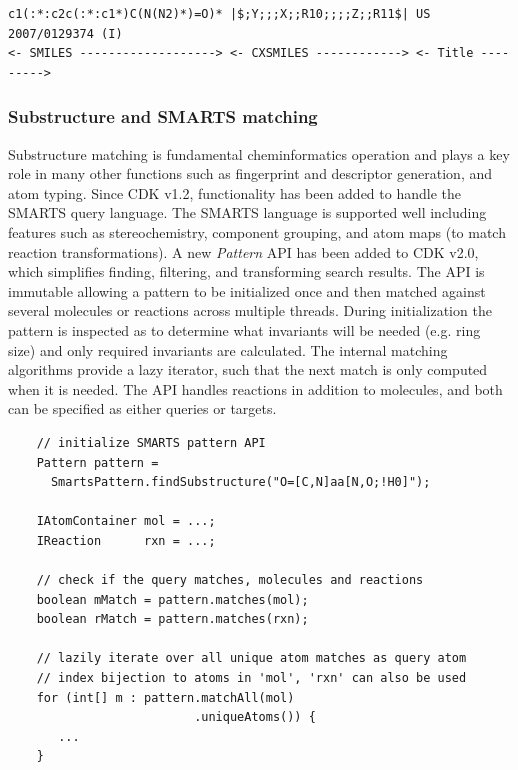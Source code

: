 \documentclass[10pt]{bmcart}
\def \cdkversion {v2.0}
\begin{document}
\vspace{0.2cm}
\small
\begin{verbatim}
c1(:*:c2c(:*:c1*)C(N(N2)*)=O)* |$;Y;;;X;;R10;;;;Z;;R11$| US 2007/0129374 (I)
<- SMILES -------------------> <- CXSMILES ------------> <- Title --------->
\end{verbatim}
\normalsize
\vspace{0.2cm}

\subsubsection*{Substructure and SMARTS matching}

Substructure matching is fundamental cheminformatics operation and
plays a key role in many other functions such as fingerprint and
descriptor generation, and atom typing. Since CDK v1.2, functionality
has been added to handle the SMARTS query language. The SMARTS
language is supported well including features such as
stereochemistry, component grouping, and atom
maps (to match reaction transformations). A new \textit{Pattern} API
has been added to CDK \cdkversion{}, which simplifies finding,
filtering, and transforming search results. The API is immutable allowing a
pattern to be initialized once and then matched against several
molecules or reactions across multiple threads. During initialization
the pattern is inspected as to determine what invariants will be
needed (e.g. ring size) and only required invariants are calculated. The
internal matching algorithms provide a lazy iterator, such that the
next match is only computed when it is needed. The API handles
reactions in addition to molecules, and both can be specified as
either queries or targets.

\vspace{0.2cm}
  \begin{verbatim}
    // initialize SMARTS pattern API
    Pattern pattern = 
      SmartsPattern.findSubstructure("O=[C,N]aa[N,O;!H0]");

    IAtomContainer mol = ...;
    IReaction      rxn = ...;

    // check if the query matches, molecules and reactions
    boolean mMatch = pattern.matches(mol);
    boolean rMatch = pattern.matches(rxn);         

    // lazily iterate over all unique atom matches as query atom
    // index bijection to atoms in 'mol', 'rxn' can also be used
    for (int[] m : pattern.matchAll(mol)
                          .uniqueAtoms()) {
       ...
    }
  \end{verbatim}
\vspace{0.2cm}
\end{document}

